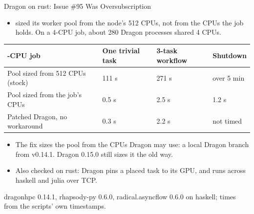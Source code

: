 \documentclass[aspectratio=169, 10pt, t]{beamer}
\begin{document}
\begin{frame}{Dragon on rust: Issue \#95 Was Oversubscription}
\bodysmall
\begin{itemize}
  \item {} sized its worker pool from the node's 512 CPUs, not from the CPUs the job holds. On a 4-CPU job, about 280 Dragon processes shared 4 CPUs.
\end{itemize}
\begin{lecturetable}{\footnotesize}
\begin{tabular}{|B{6.0cm}|L{2.6cm}|L{2.6cm}|L{2.6cm}|}
\hline
{}-CPU job & One trivial task & 3-task workflow & Shutdown \\ \hline
Pool sized from 512 CPUs (stock) & 111 s & 271 s & over 5 min \\ \hline
Pool sized from the job's CPUs & 0.5 s & 2.5 s & 1.2 s \\ \hline
Patched Dragon, no workaround & 0.3 s & 2.2 s & not timed \\ \hline
\end{tabular}
\end{lecturetable}
\vspace{4pt}
\begin{itemize}
  \item The fix sizes the pool from the CPUs Dragon may use: a local Dragon branch from v0.14.1. Dragon 0.15.0 still sizes it the old way.
  \item Also checked on rust: Dragon pins a placed task to its GPU, and runs across haskell and julia over TCP.
\end{itemize}
\vfill
{\fontsize{7}{8.4}\selectfont\color{labelgray}dragonhpc 0.14.1, rhapsody-py 0.6.0, radical.asyncflow 0.6.0 on haskell; times from the scripts' own timestamps.\par}
\end{frame}
\end{document}
